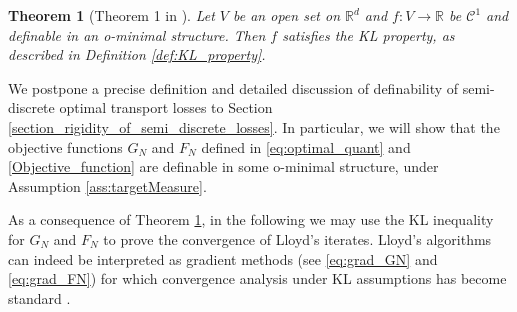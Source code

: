 \documentclass[11pt]{article}
\newcommand{\R}{\mathbb R}
\newcommand{\1}{\mathbbm{1}}
\newtheorem{thm}[lem]{Theorem}
\numberwithin{equation}{section}
\begin{document}
\begin{thm}[Theorem 1 in \cite{KurdykaarticleominimpliqueKL}]
\label{th:kurdyka}
Let $V$ be an open set on $\R^d$ and $f \colon V \to \R$ be $\mathcal{C}^1$ and definable in an o-minimal structure. Then $f$ satisfies the KL property, as described in Definition \ref{def:KL_property}.
\end{thm}
 

We postpone a precise definition and detailed discussion of definability of semi-discrete optimal transport losses to Section \ref{section_rigidity_of_semi_discrete_losses}. In particular, we will show that the objective functions $G_{N}$ and $F_{N}$ defined in \eqref{eq:optimal_quant} and \eqref{Objective_function} are definable in some o-minimal structure, under Assumption \ref{ass:targetMeasure}.

As a consequence of Theorem \ref{th:kurdyka}, in the following we may use the KL inequality for $G_{N}$ and $F_{N}$ to prove the convergence of Lloyd's iterates. Lloyd's algorithms can indeed be interpreted as gradient methods (see \eqref{eq:grad_GN} and \eqref{eq:grad_FN}) for which convergence analysis under KL assumptions has become standard \cite{AbsMahAnd2005,proximalbolte2010defKL,attouch2013convergence,bolte2014proximal}. 
\end{document}
